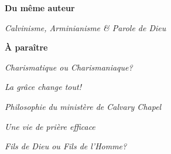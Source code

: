 \newpage
\mbox{}
\vfill
{\small

\begin{center}
{\bfseries Du même auteur}

\textit{Calvinisme, Arminianisme \& Parole de Dieu}

\end{center}

\begin{center}
{\bfseries À paraître}

\textit{Charismatique ou Charismaniaque?}

\textit{La grâce change tout!}

\textit{Philosophie du ministère de Calvary Chapel}

\textit{Une vie de prière efficace}

\textit{Fils de Dieu ou Fils de l'Homme?}


\end{center}
}
\vfill
\mbox{}
\vfill
\mbox{}
\thispagestyle{empty}

